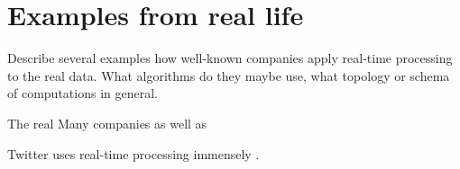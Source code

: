 \section{Examples from real life}

Describe several examples how well-known companies apply real-time processing to the real data.
What algorithms do they maybe use, what topology or schema of computations in general.

The real
Many companies as well as 

Twitter uses real-time processing immensely \cite{Toshniwal2014} \cite{Boykin2013}.


